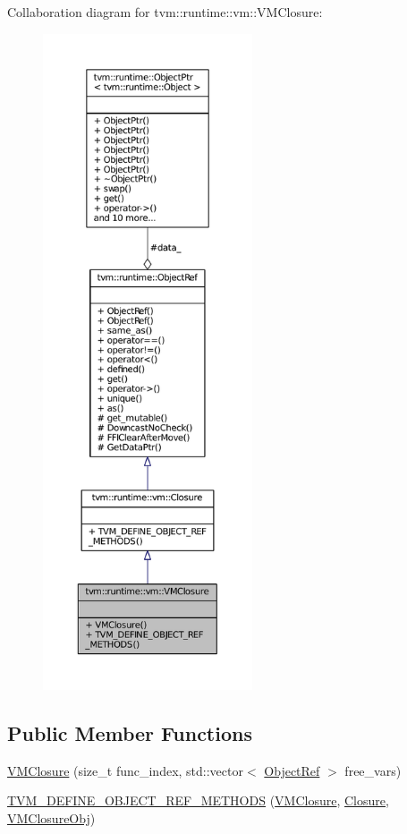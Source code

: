 Collaboration diagram for tvm\+:\+:runtime\+:\+:vm\+:\+:V\+M\+Closure\+:
\nopagebreak
\begin{figure}[H]
\begin{center}
\leavevmode
\includegraphics[height=550pt]{classtvm_1_1runtime_1_1vm_1_1VMClosure__coll__graph}
\end{center}
\end{figure}
\subsection*{Public Member Functions}
\begin{DoxyCompactItemize}
\item 
\hyperlink{classtvm_1_1runtime_1_1vm_1_1VMClosure_a8278c34633af65da6ecb7543fc429ce5}{V\+M\+Closure} (size\+\_\+t func\+\_\+index, std\+::vector$<$ \hyperlink{classtvm_1_1runtime_1_1ObjectRef}{Object\+Ref} $>$ free\+\_\+vars)
\item 
\hyperlink{classtvm_1_1runtime_1_1vm_1_1VMClosure_af65a13e55ad7c8920cbdedecc97280ce}{T\+V\+M\+\_\+\+D\+E\+F\+I\+N\+E\+\_\+\+O\+B\+J\+E\+C\+T\+\_\+\+R\+E\+F\+\_\+\+M\+E\+T\+H\+O\+DS} (\hyperlink{classtvm_1_1runtime_1_1vm_1_1VMClosure}{V\+M\+Closure}, \hyperlink{classtvm_1_1runtime_1_1vm_1_1Closure}{Closure}, \hyperlink{classtvm_1_1runtime_1_1vm_1_1VMClosureObj}{V\+M\+Closure\+Obj})
\end{DoxyCompactItemize}
